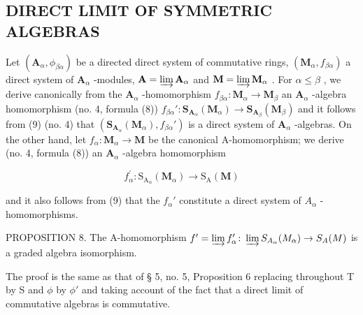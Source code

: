 \subsection{DIRECT LIMIT OF SYMMETRIC ALGEBRAS}

Let \((\mathbf{A}_{\alpha},\phi_{\beta \alpha})\) be a directed direct system of commutative rings, \((\mathbf{M}_{\alpha},f_{\beta \alpha})\) a direct system of \(\mathbf{A}_{\alpha}\) -modules, \(\mathbf{A} = \varinjlim \mathbf{A}_{\alpha}\) and \(\mathbf{M} = \varinjlim \mathbf{M}_{\alpha}\) . For \(\alpha \leqslant \beta\) , we derive canonically from the \(\mathbf{A}_{\alpha}\) -homomorphism \(f_{\beta \alpha}: \mathbf{M}_{\alpha} \to \mathbf{M}_{\beta}\) an \(\mathbf{A}_{\alpha}\) -algebra homomorphism (no. 4, formula (8)) \(f_{\beta \alpha}': \mathbf{S}_{\mathbf{A}_{\alpha}}(\mathbf{M}_{\alpha}) \to \mathbf{S}_{\mathbf{A}_{\beta}}(\mathbf{M}_{\beta})\) and it follows from (9) (no. 4) that \((\mathbf{S}_{\mathbf{A}_{\alpha}}(\mathbf{M}_{\alpha}), f_{\beta \alpha}')\) is a direct system of \(\mathbf{A}_{\alpha}\) -algebras. On the other hand, let \(f_{\alpha}: \mathbf{M}_{\alpha} \to \mathbf{M}\) be the canonical A-homomorphism; we derive (no. 4, formula (8)) an \(\mathbf{A}_{\alpha}\) -algebra homomorphism

\[
f _ {\alpha} ^ {\prime}: \mathrm{S} _ {\mathrm{A} _ {\alpha}} (\mathbf {M} _ {\alpha}) \rightarrow \mathrm{S} _ {\mathrm{A}} (\mathbf {M})
\]

and it also follows from (9) that the \(f_{\alpha}'\) constitute a direct system of \(A_{\alpha}\) -homomorphisms.

PROPOSITION 8. The A-homomorphism \(f' = \varinjlim f_{\alpha}' \colon \varinjlim S_{A_{\alpha}}(M_{\alpha}) \to S_{A}(M)\) is a graded algebra isomorphism.

The proof is the same as that of § 5, no. 5, Proposition 6 replacing throughout T by S and \(\phi\) by \(\phi'\) and taking account of the fact that a direct limit of commutative algebras is commutative.


